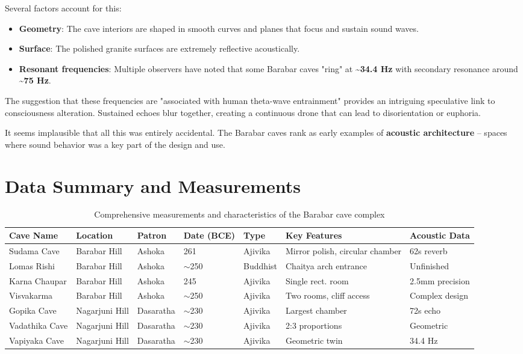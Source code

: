\documentclass[11pt]{article}
\begin{document}
Several factors account for this:

\begin{itemize}
\item \textbf{Geometry}: The cave interiors are shaped in smooth curves and planes that focus and sustain sound waves.
\item \textbf{Surface}: The polished granite surfaces are extremely reflective acoustically.
\item \textbf{Resonant frequencies}: Multiple observers have noted that some Barabar caves "ring" at \textbf{\textasciitilde 34.4 Hz} with secondary resonance around \textbf{\textasciitilde 75 Hz}.
\end{itemize}

The suggestion that these frequencies are "associated with human theta-wave entrainment" provides an intriguing speculative link to consciousness alteration. Sustained echoes blur together, creating a continuous drone that can lead to disorientation or euphoria.

It seems implausible that all this was entirely accidental. The Barabar caves rank as early examples of \textbf{acoustic architecture} -- spaces where sound behavior was a key part of the design and use.

\section{Data Summary and Measurements}

\begin{table}[H]
\centering
\caption{Comprehensive measurements and characteristics of the Barabar cave complex}
\label{tab:cave_data}
\footnotesize
\begin{tabular}{@{}p{2.2cm}p{1.8cm}p{1.3cm}p{1.3cm}p{1.5cm}p{2.8cm}p{1.8cm}@{}}
\toprule
\textbf{Cave Name} & \textbf{Location} & \textbf{Patron} & \textbf{Date (BCE)} & \textbf{Type} & \textbf{Key Features} & \textbf{Acoustic Data} \\
\midrule
Sudama Cave & Barabar Hill & Ashoka & 261 & Ajivika & Mirror polish, circular chamber & 62s reverb \\
Lomas Rishi & Barabar Hill & Ashoka & $\sim$250 & Buddhist & Chaitya arch entrance & Unfinished \\
Karna Chaupar & Barabar Hill & Ashoka & 245 & Ajivika & Single rect. room & 2.5mm precision \\
Visvakarma & Barabar Hill & Ashoka & $\sim$250 & Ajivika & Two rooms, cliff access & Complex design \\
Gopika Cave & Nagarjuni Hill & Dasaratha & $\sim$230 & Ajivika & Largest chamber & 72s echo \\
Vadathika Cave & Nagarjuni Hill & Dasaratha & $\sim$230 & Ajivika & 2:3 proportions & Geometric \\
Vapiyaka Cave & Nagarjuni Hill & Dasaratha & $\sim$230 & Ajivika & Geometric twin & 34.4 Hz \\
\bottomrule
\end{tabular}
\end{table}
\end{document}
